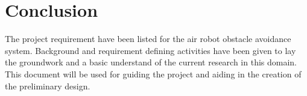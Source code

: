 \documentclass{article}
\begin{document}
\section{Conclusion}

The project requirement have been listed for the air robot obstacle avoidance system. Background and requirement defining activities have been given to lay the groundwork and a basic understand of the current research in this domain. This document will be used for guiding the project and aiding in the creation of the preliminary design. 


\printbibliography

\end{document}
